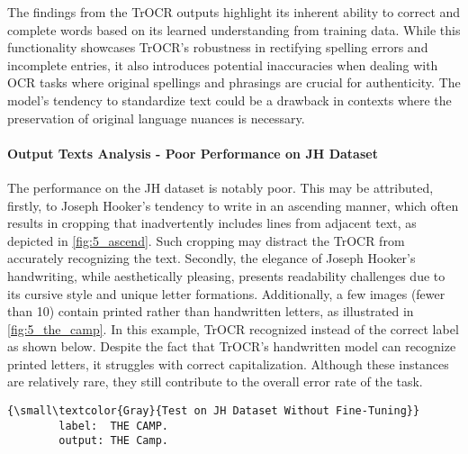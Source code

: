 The findings from the TrOCR outputs highlight its inherent ability to correct and complete words based on its learned understanding from training data. While this functionality showcases TrOCR's robustness in rectifying spelling errors and incomplete entries, it also introduces potential inaccuracies when dealing with OCR tasks where original spellings and phrasings are crucial for authenticity. The model's tendency to standardize text could be a drawback in contexts where the preservation of original language nuances is necessary.

\paragraph*{Output Texts Analysis - Poor Performance on JH Dataset}
The performance on the JH dataset is notably poor. This may be attributed, firstly, to Joseph Hooker's tendency to write in an ascending manner, which often results in cropping that inadvertently includes lines from adjacent text, as depicted in \autoref{fig:5_ascend}. Such cropping may distract the TrOCR from accurately recognizing the text. Secondly, the elegance of Joseph Hooker's handwriting, while aesthetically pleasing, presents readability challenges due to its cursive style and unique letter formations. Additionally, a few images (fewer than 10) contain printed rather than handwritten letters, as illustrated in \autoref{fig:5_the_camp}. In this example, TrOCR recognized  instead of the correct label  as shown below. Despite the fact that TrOCR's handwritten model can recognize printed letters, it struggles with correct capitalization. Although these instances are relatively rare, they still contribute to the overall error rate of the task.

\begin{center}
    \begin{minipage}{0.7\textwidth}
    \begin{Verbatim}[commandchars=\\\{\}]
        {\small\textcolor{Gray}{Test on JH Dataset Without Fine-Tuning}}
        label:  THE CAMP.
        output: THE Camp.
    \end{Verbatim}
    \end{minipage}
\end{center}


